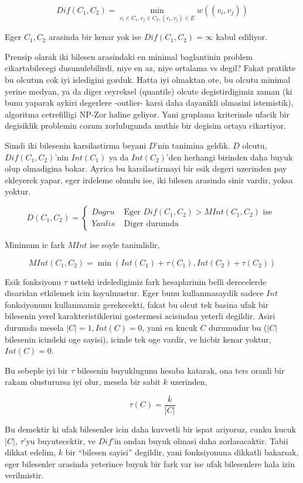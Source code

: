 \documentclass[12pt,fleqn]{article}\usepackage{../common}
\begin{document}
$$ Dif(C_1,C_2) = \min_{v_i \in C_1, v_j \in C_2, (v_i,v_j) \in E} w((v_i,v_j))$$

Eger $C_1,C_2$ arasinda bir kenar yok ise $Dif(C_1,C_2) = \infty$ kabul
ediliyor. 

Prensip olarak iki bilesen arasindaki en minimal baglantinin problem
cikartabilecegi dusunulebilirdi, niye en az, niye ortalama vs degil? Fakat
pratikte bu olcutun cok iyi isledigini gorduk. Hatta iyi olmaktan ote, bu
olcutu minimal yerine medyan, ya da diger ceyreksel (quantile) olcute
degistirdigimiz zaman (ki bunu yaparak aykiri degerlere -outlier- karsi
daha dayanikli olmasini istemistik), algoritma cetrefilligi NP-Zor haline
geliyor. Yani gruplama kriterinde ufacik bir degisiklik problemin cozum
zorlulugunda muthis bir degisim ortaya cikartiyor. 

Simdi iki bilesenin karsilastirma beyani $D$'nin tanimina geldik. $D$ olcutu,
$Dif(C_1,C_2)$'nin $Int(C_1)$ ya da $Int(C_2)$'den herhangi birinden daha
buyuk olup olmadigina bakar. Ayrica bu karsilastirmayi bir esik degeri
uzerinden pay ekleyerek yapar, eger irdeleme olumlu ise, iki bilesen
arasinda sinir vardir, yoksa yoktur.

$$ 
D(C_1,C_2) = 
\left\{ \begin{array}{ll}
Dogru & \textrm{ Eger } Dif(C_1,C_2) > MInt(C_1,C_2) \textrm{ ise } \\
Yanlis & \textrm{ Diger durumda }
\end{array} \right.
 $$

Minimum ic fark $MInt$ ise soyle tanimlidir,

$$ 
MInt(C_1,C_2) = \min (Int(C_1)+\tau(C_1), Int(C_2)+\tau(C_2))
 $$

Esik fonksiyonu $\tau$ ustteki irdeledigimiz fark hesaplarinin belli
derecelerde disaridan etkilemek icin koyulmustur. Eger bunu kullanmasaydik
sadece $Int$ fonksiyonunu kullanmamiz gerekecekti, fakat bu olcut tek
basina ufak bir bilesenin yerel karakteristiklerini gostermesi acisindan yeterli
degildir. Asiri durumda mesela $|C| = 1,Int(C)=0$, yani en kucuk $C$
durumudur bu ($|C|$ bilesenin icindeki oge sayisi), icinde tek oge vardir,
ve hicbir kenar yoktur, $Int(C) = 0$.  

Bu sebeple iyi bir $\tau$ bilesenin buyuklugunu hesaba katarak, ona ters
oranli bir rakam olusturursa iyi olur, mesela bir sabit $k$ uzerinden,

$$ \tau(C) = \frac{k}{|C|} $$

Bu demektir ki ufak bilesenler icin daha kuvvetli bir ispat ariyoruz, cunku
kucuk $|C|$, $\tau$'yu buyutecektir, ve $Dif$'in ondan buyuk olmasi daha
zorlasacaktir. Tabii dikkat edelim, $k$ bir ``bilesen sayisi'' degildir,
yani fonksiyonuna dikkatli bakarsak, eger bilesenler arasinda yeterince
buyuk bir fark var ise ufak bilesenlere hala izin verilmistir.
\end{document}
